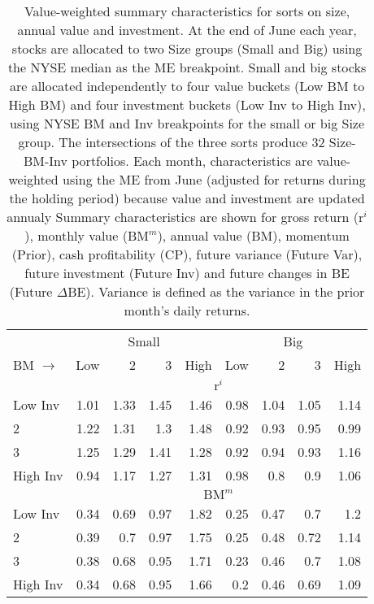
\begin{table}[!ht]
\scriptsize
\centering
\caption{
\scriptsize{
Value-weighted summary characteristics for sorts on size, annual value and
investment.
At the end of June each year, stocks are allocated to two Size groups
(Small and Big) using the NYSE median as the ME breakpoint.
Small and big stocks are allocated independently to four value buckets (Low
BM to High BM) and four investment buckets
(Low Inv to High Inv), using NYSE BM and Inv breakpoints for
the small or big Size group.
The intersections of the three sorts produce 32 Size-BM-Inv
portfolios.
Each month, characteristics are value-weighted using the ME from June
(adjusted for returns during the holding period) because value and investment
are updated annualy
Summary characteristics are shown for
gross return ($\text{r}^i$),
monthly value ($\text{BM}^m$),
annual value (BM),
momentum (Prior),
cash profitability (CP),
future variance (Future Var),
future investment (Future Inv) and
future changes in BE (Future $\Delta$BE).
Variance is defined as the variance in the prior month's daily returns.
}
}
\begin{tabular}{lrrrrrrrr}
  \toprule
     & \multicolumn{4}{c}{Small} & \multicolumn{4}{c}{Big}  \\
     \cmidrule(r){2-5} \cmidrule(r){6-9}
    BM $\rightarrow$ & Low & 2 & 3 & High & Low & 2 & 3 & High  \\ 
  \midrule
  
  
    & \multicolumn{8}{c}{$\text{r}^i$}  \\
     \cmidrule(r){2-5} \cmidrule(r){6-9}
    Low Inv  & 1.01  & 1.33  & 1.45  & 1.46  & 0.98  & 1.04  & 1.05  & 1.14   \\
    2  & 1.22  & 1.31  & 1.3  & 1.48  & 0.92  & 0.93  & 0.95  & 0.99   \\
    3  & 1.25  & 1.29  & 1.41  & 1.28  & 0.92  & 0.94  & 0.93  & 1.16   \\
    High Inv  & 0.94  & 1.17  & 1.27  & 1.31  & 0.98  & 0.8  & 0.9  & 1.06   \\
    
  
    & \multicolumn{8}{c}{$\text{BM}^m$}  \\
     \cmidrule(r){2-5} \cmidrule(r){6-9}
    Low Inv  & 0.34  & 0.69  & 0.97  & 1.82  & 0.25  & 0.47  & 0.7  & 1.2   \\
    2  & 0.39  & 0.7  & 0.97  & 1.75  & 0.25  & 0.48  & 0.72  & 1.14   \\
    3  & 0.38  & 0.68  & 0.95  & 1.71  & 0.23  & 0.46  & 0.7  & 1.08   \\
    High Inv  & 0.34  & 0.68  & 0.95  & 1.66  & 0.2  & 0.46  & 0.69  & 1.09   \\
    

\end{tabular}
\end{table}
